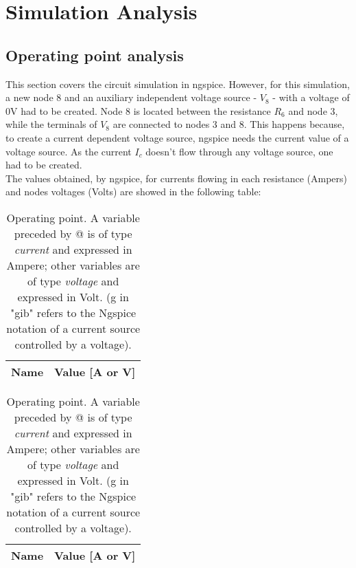 \newpage
\section{Simulation Analysis}
\label{sec:simulation}

\subsection{Operating point analysis}
This section covers the circuit simulation in ngspice. However, for this simulation, 
a new node 8 and an auxiliary independent voltage source - $V_8$ - with a voltage of 0V had to be created. 
Node 8 is located between the resistance $R_6$ and node 3, while the terminals of $V_8$ are connected to nodes 3 and 8. 
This happens because, to create a current dependent voltage source, ngspice needs the current value of a voltage source. 
As the current $I_c$ doesn't flow through any voltage source, one had to be created. \\
\noindent
The values obtained, by ngspice, for currents flowing in each resistance (Ampers) and nodes voltages (Volts) are showed in the following table:
\begin{table}[h!]
  \centering
  \begin{tabular}{|c|c|}
    \hline    
    {\bf Name} & {\bf Value [A or V]} \\ \hline
    
  \end{tabular}
  \caption{Operating point. A variable preceded by @ is of type {\em current}
    and expressed in Ampere; other variables are of type {\it voltage} and expressed in
    Volt. (g in "gib" refers to the Ngspice notation of a current source controlled by a voltage).}
  \label{tab:op}
\end{table}

\begin{table}[h!]
  \centering
  \begin{tabular}{|c|c|}
    \hline    
    {\bf Name} & {\bf Value [A or V]} \\ \hline
    
  \end{tabular}
  \caption{Operating point. A variable preceded by @ is of type {\em current}
    and expressed in Ampere; other variables are of type {\it voltage} and expressed in
    Volt. (g in "gib" refers to the Ngspice notation of a current source controlled by a voltage).}
  \label{tab:op2}
\end{table}





